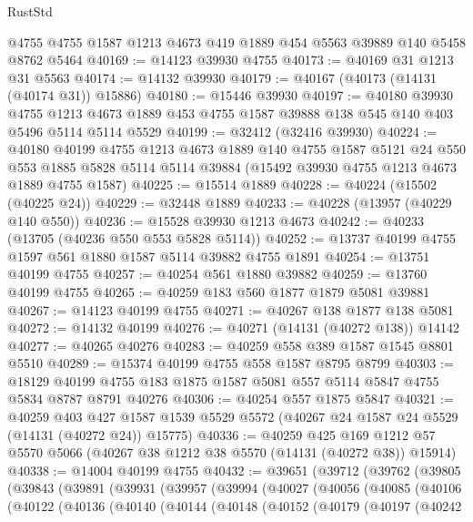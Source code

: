 \begin{lexlean}{RustStd}
\begin{coremodule}
    @4755
    @4755
    @1587
    @1213
    @4673
    @419
    @1889
    @454
    @5563
    @39889
    @140
    @5458
    @8762
    @5464
@40169 := @14123 @39930 @4755
@40173 := @40169 @31 @1213 @31 @5563
@40174 := @14132 @39930
@40179 := @40167 (@40173 (@14131 (@40174 @31)) @15886)
@40180 := @15446 @39930
@40197 := @40180
    @39930
    @4755
    @1213
    @4673
    @1889
    @453
    @4755
    @1587
    @39888
    @138
    @545
    @140
    @403
    @5496
    @5114
    @5114
    @5529
@40199 := @32412 (@32416 @39930)
@40224 := @40180
    @40199
    @4755
    @1213
    @4673
    @1889
    @140
    @4755
    @1587
    @5121
    @24
    @550
    @553
    @1885
    @5828
    @5114
    @5114
    @39884
    (@15492 @39930 @4755 @1213 @4673 @1889 @4755 @1587)
@40225 := @15514 @1889
@40228 := @40224 (@15502 (@40225 @24))
@40229 := @32448 @1889
@40233 := @40228 (@13957 (@40229 @140 @550))
@40236 := @15528 @39930 @1213 @4673
@40242 := @40233 (@13705 (@40236 @550 @553 @5828 @5114))
@40252 := @13737 @40199 @4755 @1597 @561 @1880 @1587 @5114 @39882 @4755 @1891
@40254 := @13751 @40199 @4755
@40257 := @40254 @561 @1880 @39882
@40259 := @13760 @40199 @4755
@40265 := @40259 @183 @560 @1877 @1879 @5081 @39881
@40267 := @14123 @40199 @4755
@40271 := @40267 @138 @1877 @138 @5081
@40272 := @14132 @40199
@40276 := @40271 (@14131 (@40272 @138)) @14142
@40277 := @40265 @40276
@40283 := @40259 @558 @389 @1587 @1545 @8801 @5510
@40289 := @15374 @40199 @4755 @558 @1587 @8795 @8799
@40303 := @18129 @40199 @4755 @183 @1875 @1587 @5081 @557 @5114 @5847 @4755 @5834 @8787 @8791 @40276
@40306 := @40254 @557 @1875 @5847
@40321 := @40259
    @403
    @427
    @1587
    @1539
    @5529
    @5572
    (@40267 @24 @1587 @24 @5529 (@14131 (@40272 @24)) @15775)
@40336 := @40259
    @425
    @169
    @1212
    @57
    @5570
    @5066
    (@40267 @38 @1212 @38 @5570 (@14131 (@40272 @38)) @15914)
@40338 := @14004 @40199 @4755
@40432 := @39651
    (@39712
      (@39762
        (@39805
          (@39843
            (@39891
              (@39931
                (@39957
                  (@39994
                    (@40027
                      (@40056
                        (@40085
                          (@40106
                            (@40122
                              (@40136
                                (@40140
                                  (@40144
                                    (@40148
                                      (@40152
                                        (@40179
                                          (@40197
                                            (@40242

\end{coremodule}
\end{lexlean}
